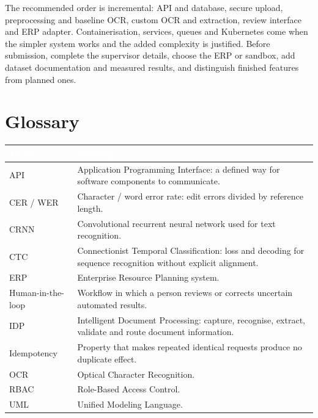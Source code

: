 \documentclass[11pt,a4paper]{report}
\newcommand{\hdr}[1]{\textcolor{white}{\sffamily\bfseries #1}}
\newcommand{\tblstart}{\rowcolors{2}{white}{rowgray}\arrayrulecolor{teal!60}}
\newcommand{\hdrrow}{\rowcolor{navy}}
\begin{document}
The recommended order is incremental: API and database, secure upload, preprocessing and baseline OCR, custom OCR and extraction, review interface and ERP adapter. Containerisation, services, queues and Kubernetes come when the simpler system works and the added complexity is justified. Before submission, complete the supervisor details, choose the ERP or sandbox, add dataset documentation and measured results, and distinguish finished features from planned ones.

\appendix
\chapter{Glossary}
{\tblstart\small
\begin{longtable}{L{3.3cm}L{10.5cm}}
\hdrrow \hdr{Term} & \hdr{Meaning}\\ \endhead
API & Application Programming Interface: a defined way for software components to communicate.\\
CER / WER & Character / word error rate: edit errors divided by reference length.\\
CRNN & Convolutional recurrent neural network used for text recognition.\\
CTC & Connectionist Temporal Classification: loss and decoding for sequence recognition without explicit alignment.\\
ERP & Enterprise Resource Planning system.\\
Human-in-the-loop & Workflow in which a person reviews or corrects uncertain automated results.\\
IDP & Intelligent Document Processing: capture, recognise, extract, validate and route document information.\\
Idempotency & Property that makes repeated identical requests produce no duplicate effect.\\
OCR & Optical Character Recognition.\\
RBAC & Role-Based Access Control.\\
UML & Unified Modeling Language.\\
\hline
\end{longtable}}
\end{document}
